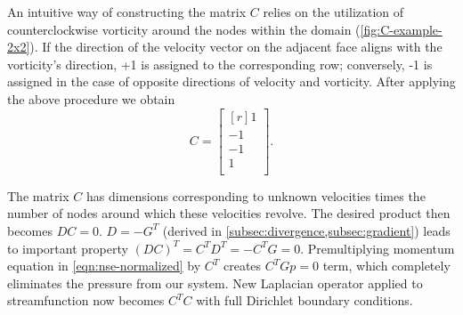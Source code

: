 \documentclass{article}
\numberwithin{equation}{section}
\begin{document}
An intuitive way of constructing the matrix $C$ relies on the utilization of counterclockwise vorticity around the nodes within the domain (\cref{fig:C-example-2x2}). If the direction of the velocity vector on the adjacent face aligns with the vorticity's direction, +1 is assigned to the corresponding row; conversely, -1 is assigned in the case of opposite directions of velocity and vorticity. After applying the above procedure we obtain
\begin{equation*}
  C = 
  \begin{bmatrix*}[r]
  1		\\
  -1	\\
  -1	\\
  1		\\
\end{bmatrix*}.
\end{equation*}

The matrix $C$ has dimensions corresponding to unknown velocities times the number of nodes around which these velocities revolve. 
The desired product then becomes $DC=0$. $D=-G^T$ (derived in \cref{subsec:divergence,subsec:gradient}) leads to important property $(DC)^T=C^TD^T=-C^TG=0$. 
Premultiplying momentum equation in \cref{eqn:nse-normalized} by $C^T$ creates $C^TGp=0$ term, which completely eliminates the pressure from our system. New Laplacian operator applied to streamfunction now becomes $C^TC$ with full Dirichlet boundary conditions.
\end{document}
